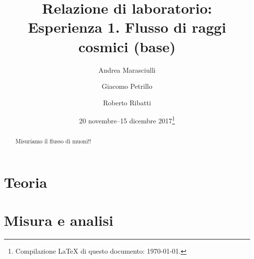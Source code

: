 \documentclass[a4paper]{article}
\title{Relazione di laboratorio:\\
Esperienza 1. Flusso di raggi cosmici (base)}
\author{Andrea Marasciulli
\and Giacomo Petrillo
\and Roberto Ribatti}
\date{20 novembre--15 dicembre 2017\footnote{Compilazione \LaTeX{} di questo documento: \today.}}
\begin{document}
\maketitle

\begin{abstract}
	Misuriamo il flusso di muoni!!
\end{abstract}

\tableofcontents



\section{Teoria}







\section{Misura e analisi}




\end{document}
